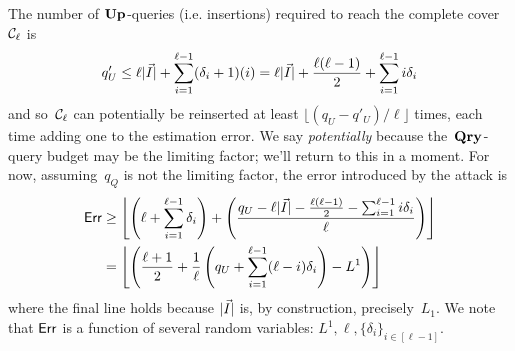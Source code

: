 The number of $\textup{\textbf{Up}}\hspace{0.5pt}$-queries (i.e. insertions) required to reach the complete cover~$\mathcal{C}_\ell$ is 
\[
q'_U \leq \ell|\vec{I}| + \sum_{i=1}^{\ell-1}(\delta_i + 1)(i) = \ell|\vec{I}| + \frac{\ell(\ell-1)}{2} + \sum_{i=1}^{\ell-1} i \delta_i
\]
and so~$\mathcal{C}_\ell$ can potentially be reinserted at least $\lfloor (q_U - q'_U)/\ell \rfloor$ times, each time adding one to the estimation error.  We say \emph{potentially} because the~$\textup{\textbf{Qry}}\hspace{0.5pt}$-query budget may be the limiting factor; we'll return to this in a moment.  For now, assuming~$q_Q$ is not the limiting factor, the error introduced by the attack is
\begin{align*}
	\mathsf{Err} &\geq \left\lfloor \left( \ell + \sum_{i=1}^{\ell-1}\delta_i \right) + \left( \frac{q_U - \ell|\vec{I}| - \frac{\ell(\ell-1)}{2} - \sum_{i=1}^{\ell-1} i \delta_i}{\ell} \right) \right\rfloor\\
	&= \left\lfloor \left( \frac{\ell+1}{2} + \frac{1}{\ell}\left(q_U + \sum_{i=1}^{\ell-1}(\ell-i)\delta_i \right) - L^1 \right) \right\rfloor
\end{align*}
where the final line holds because $|\vec{I}|$ is, by construction, precisely~$L_1$.  We note that $\mathsf{Err}$ is a function of several random variables: $L^1, \ell, \{\delta_i\}_{i \in [\ell-1]}$.  


